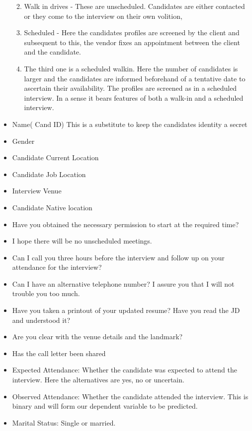 \documentclass[12pt, krantz2,]{krantz}
\providecommand{\tightlist}{%
  \setlength{\itemsep}{0pt}\setlength{\parskip}{0pt}}
\begin{document}
\begin{itemize}
  \begin{enumerate}
  \def\labelenumi{\arabic{enumi}.}
  \tightlist
  \item
    Walk in drives - These are unscheduled. Candidates are either contacted or they come to the interview on their own volition,
  \item
    Scheduled - Here the candidates profiles are screened by the client and subsequent to this, the vendor fixes an appointment between the client and the candidate.
  \item
    The third one is a scheduled walkin. Here the number of candidates is larger and the candidates are informed beforehand of a tentative date to ascertain their availability. The profiles are screened as in a scheduled interview. In a sense it bears features of both a walk-in and a scheduled interview.
  \end{enumerate}
\item
  Name( Cand ID) This is a substitute to keep the candidates identity a secret
\item
  Gender
\item
  Candidate Current Location
\item
  Candidate Job Location
\item
  Interview Venue
\item
  Candidate Native location
\item
  Have you obtained the necessary permission to start at the required time?
\item
  I hope there will be no unscheduled meetings.
\item
  Can I call you three hours before the interview and follow up on your attendance for the interview?
\item
  Can I have an alternative telephone number? I assure you that I will not trouble you too much.
\item
  Have you taken a printout of your updated resume? Have you read the JD and understood it?
\item
  Are you clear with the venue details and the landmark?
\item
  Has the call letter been shared
\item
  Expected Attendance: Whether the candidate was expected to attend the interview. Here the alternatives are yes, no or uncertain.
\item
  Observed Attendance: Whether the candidate attended the interview. This is binary and will form our dependent variable to be predicted.
\item
  Marital Status: Single or married.
\end{itemize}
\end{document}
